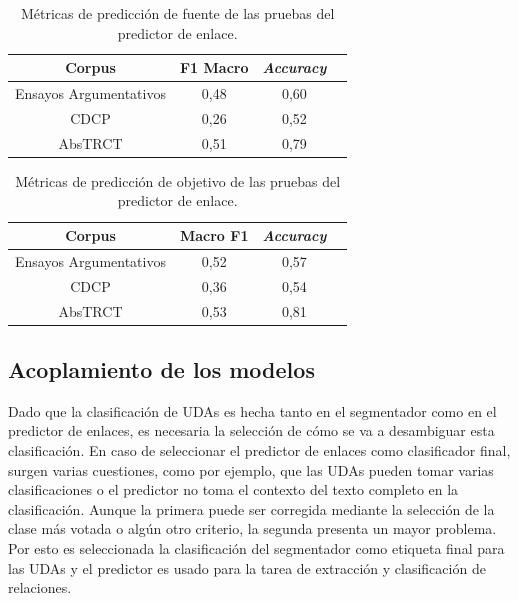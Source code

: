 \begin{table}[h!]
	\begin{center}
		\begin{tabular}{|c|c|c|c|} \hline
        Corpus		            & F1 Macro  & \emph{Accuracy} \\ \hline
        Ensayos Argumentativos  & 0,48       & 0,60             \\ \hline
        CDCP		            & 0,26       & 0,52	         \\ \hline
        AbsTRCT	                & 0,51       & 0,79	         \\ \hline
        \end{tabular}
	\caption{Métricas de predicción de fuente de las pruebas del predictor de enlace.}\label{table:test_source_metrics_link_predictor}
	\end{center}
\end{table}

\begin{table}[h!]
	\begin{center}
		\begin{tabular}{|c|c|c|c|} \hline
        Corpus		            & Macro F1 & \emph{Accuracy} \\ \hline
        Ensayos Argumentativos  & 0,52	   & 0,57             \\ \hline
        CDCP		            & 0,36	   & 0,54	         \\ \hline
        AbsTRCT	                & 0,53	   & 0,81	         \\ \hline
        \end{tabular}
	\caption{Métricas de predicción de objetivo de las pruebas del predictor de enlace.}\label{table:test_target_metrics_link_predictor}
	\end{center}
\end{table}

\subsection{Acoplamiento de los modelos}

Dado que la clasificación de UDAs es hecha tanto en el segmentador como en el predictor de enlaces, es necesaria 
la selección de cómo se va a desambiguar esta clasificación. En caso de seleccionar el predictor de enlaces como 
clasificador final, surgen varias cuestiones, como por ejemplo, que las UDAs pueden tomar varias clasificaciones o el
predictor no toma el contexto del texto completo en la clasificación. Aunque la primera puede ser corregida
mediante la selección de la clase más votada o algún otro criterio, la segunda presenta un mayor problema. Por
esto es seleccionada la clasificación del segmentador como etiqueta final para las UDAs y el predictor es usado para 
la tarea de extracción y clasificación de relaciones.

